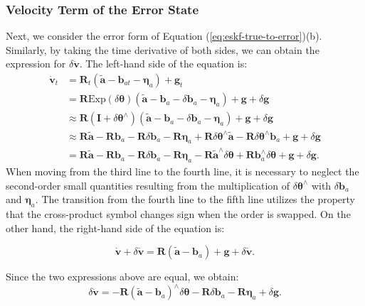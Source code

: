 \subsubsection{Velocity Term of the Error State}
Next, we consider the error form of Equation (\ref{eq:eskf-true-to-error})(b). Similarly, by taking the time derivative of both sides, we can obtain the expression for $\delta \dot{\bm{v}}$. The left-hand side of the equation is:
\begin{equation}
	\begin{aligned}
		\dot{\bm{v}}_t &= \bm{R}_t(\tilde{\bm{a}} - \bm{b}_{at} - \boldsymbol{\eta}_a) + \bm{g}_t \\
		&= \bm{R} \mathrm{Exp}(\delta \boldsymbol{\theta}) (\tilde{\bm{a}} - \bm{b}_a - \delta \bm{b}_a 
		- \boldsymbol{\eta}_a ) + \bm{g} + \delta \bm{g} \\
		&\approx \bm{R} (\bm{I} + \delta \boldsymbol{\theta}^\wedge ) (\tilde{\bm{a}} - \bm{b}_a - \delta 
		\bm{b}_a - \boldsymbol{\eta}_a) + \bm{g} + \delta \bm{g} \\
		&\approx \bm{R} \tilde{\bm{a}} - \bm{R} \bm{b}_a - \bm{R} \delta \bm{b}_a - \bm{R} 
		\boldsymbol{\eta}_a + \bm{R} \delta \boldsymbol{\theta}^\wedge \tilde{\bm{a}} - \bm{R} \delta 
		\boldsymbol{\theta}^\wedge \bm{b}_a + \bm{g} + \delta \bm{g} \\
		&= \bm{R} \tilde{\bm{a}} - \bm{R} \bm{b}_a - \bm{R} \delta \bm{b}_a - \bm{R} 
		\boldsymbol{\eta}_a - \bm{R} \tilde{\bm{a}}^\wedge \delta \boldsymbol{\theta}  + \bm{R} 
		\bm{b}_a^\wedge  \delta\boldsymbol{\theta}  + \bm{g} + \delta \bm{g}.
	\end{aligned}
\end{equation}
When moving from the third line to the fourth line, it is necessary to neglect the second-order small quantities resulting from the multiplication of $\delta \boldsymbol{\theta}^\wedge$ with $\delta \bm{b}_a$ and $\boldsymbol{\eta}_a$. The transition from the fourth line to the fifth line utilizes the property that the cross-product symbol changes sign when the order is swapped. On the other hand, the right-hand side of the equation is:

\begin{equation}\label{key}
	\dot{\bm{v}} + \delta \dot{\bm{v}} = \bm{R}(\tilde{\bm{a}} - \bm{b}_a) + \bm{g} + \delta \dot{\bm{v}}.
\end{equation}

Since the two expressions above are equal, we obtain:
\begin{equation}\label{key}
	\delta \dot{\bm{v}} = - \bm{R}(\tilde{\bm{a}} - \bm{b}_a)^\wedge \delta \boldsymbol{\theta} - 
	\bm{R} \delta \bm{b}_a  - \bm{R} \boldsymbol{\eta}_a + \delta \bm{g}.
\end{equation}


